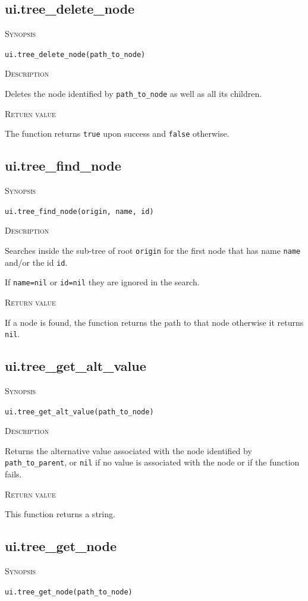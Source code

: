 \documentclass[11pt]{report}
\newcommand{\mansection}[1]{\vspace{0.5em}\par\noindent\textsc{#1}\vspace{0.5em}\par}
\newcommand{\syn}[1]{\texttt{#1}}
\begin{document}
\subsection{ui.tree\_delete\_node}

\mansection{Synopsis}
\syn{ui.tree\_delete\_node(path\_to\_node)}

\mansection{Description}
  Deletes the node identified by \syn{path\_to\_node} as well as all its 
  children.

\mansection{Return value}
  The function returns \syn{true} upon success and \syn{false} otherwise.


\subsection{ui.tree\_find\_node}

\mansection{Synopsis}
\syn{ui.tree\_find\_node(origin, name, id)}

\mansection{Description}
  Searches inside the sub-tree of root \syn{origin} for the first node that has 
  name \syn{name} and/or the id \syn{id}.

  If \syn{name=nil} or \syn{id=nil} they are ignored in the search.

\mansection{Return value}
  If a node is found, the function returns the path to that node otherwise 
  it returns \syn{nil}.

\subsection{ui.tree\_get\_alt\_value}

\mansection{Synopsis}
\syn{ui.tree\_get\_alt\_value(path\_to\_node)}

\mansection{Description}
  Returns the alternative value associated with the node identified by \syn{path\_to\_parent}, 
  or \syn{nil} if no value is associated with the node or if the function fails.

\mansection{Return value}
  This function returns a string.
 

\subsection{ui.tree\_get\_node}

\mansection{Synopsis}
\syn{ui.tree\_get\_node(path\_to\_node)}
\end{document}
